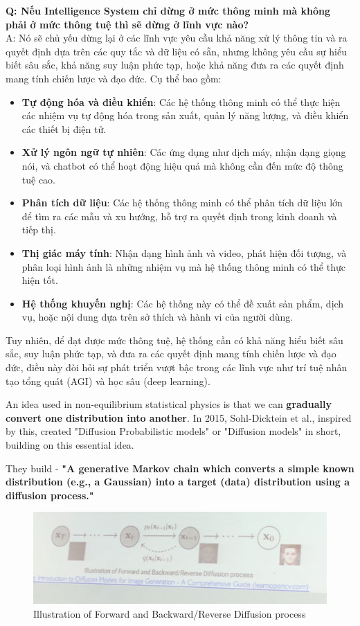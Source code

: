 \textbf{Q: Nếu Intelligence System chỉ dừng ở mức thông minh mà không phải ở mức thông tuệ thì sẽ dừng ở lĩnh vực nào?}\\
A: Nó sẽ chủ yếu dừng lại ở các lĩnh vực yêu cầu khả năng xử lý thông tin và ra quyết định dựa trên các quy tắc và dữ liệu có sẵn, nhưng không yêu cầu sự hiểu biết sâu sắc, khả năng suy luận phức tạp, hoặc khả năng đưa ra các quyết định mang tính chiến lược và đạo đức. Cụ thể bao gồm:
\begin{itemize}
    \item \textbf{Tự động hóa và điều khiển}: Các hệ thống thông minh có thể thực hiện các nhiệm vụ tự động hóa trong sản xuất, quản lý năng lượng, và điều khiển các thiết bị điện tử.
    \item \textbf{Xử lý ngôn ngữ tự nhiên}: Các ứng dụng như dịch máy, nhận dạng giọng nói, và chatbot có thể hoạt động hiệu quả mà không cần đến mức độ thông tuệ cao.
    \item \textbf{Phân tích dữ liệu}: Các hệ thống thông minh có thể phân tích dữ liệu lớn để tìm ra các mẫu và xu hướng, hỗ trợ ra quyết định trong kinh doanh và tiếp thị.
    \item \textbf{Thị giác máy tính}: Nhận dạng hình ảnh và video, phát hiện đối tượng, và phân loại hình ảnh là những nhiệm vụ mà hệ thống thông minh có thể thực hiện tốt.
    \item \textbf{Hệ thống khuyến nghị}: Các hệ thống này có thể đề xuất sản phẩm, dịch vụ, hoặc nội dung dựa trên sở thích và hành vi của người dùng.
\end{itemize}

Tuy nhiên, để đạt được mức thông tuệ, hệ thống cần có khả năng hiểu biết sâu sắc, suy luận phức tạp, và đưa ra các quyết định mang tính chiến lược và đạo đức, điều này đòi hỏi sự phát triển vượt bậc trong các lĩnh vực như trí tuệ nhân tạo tổng quát (AGI) và học sâu (deep learning).

An idea used in non-equilibrium statistical physics is that we can \textbf{gradually convert one distribution into another}. In 2015, Sohl-Dicktein et al., inspired by this, created "Diffusion Probabilistic models" or "Diffusion models" in short, building on this essential idea.

They build - \textbf{"A generative Markov chain which converts a simple known distribution (e.g., a Gaussian) into a target (data) distribution using a diffusion process."}

\begin{figure}[H]
    \centering
    \includegraphics[scale=.2]{img/ForwardNBackwardORReverse Diffusion process.jpg}
    \caption{Illustration of Forward and Backward/Reverse Diffusion process}
    \label{fig:my_label_with_H}
\end{figure}

